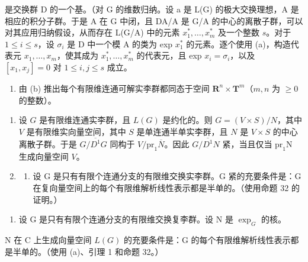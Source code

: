   是交换群 D 的一个基。（对 G 的维数归纳。设 a 是 L(G) 的极大交换理想，A 是相应的积分子群。于是 A 在 G 中闭，且 DA/A 是 G/A 的中心的离散子群，可以对其应用归纳假设，从而存在 L(G/A) 中的元素 \(x_1^*, \ldots, x_m^*\) 及一个整数 \(s\)。对于 \(1 \leqslant i \leqslant s\)，设 \(\sigma_i\) 是 D 中一个模 A 的类为 exp \(x_1^*\) 的元素。逐个使用 (a)，构造代表元 \(x_1, \ldots, x_m\)，使其成为 \(x_1^*, \ldots, x_m^*\) 的代表元，且 exp \(x_i = \sigma_i\)，以及 \([x_1, x_j] = 0\) 对 \(1 \leqslant i, j \leqslant s\) 成立。

\begin{enumerate}
\def\labelenumi{(\alph{enumi})}
\setcounter{enumi}{2}
\tightlist
\item
  由 (b) 推出每个有限维连通可解实李群都同态于空间 \(\mathbf{R}^n\times \mathbf{T}^m\)（\(m,n\) 为 \(\geqslant 0\) 的整数）。
\end{enumerate}

\begin{enumerate}
\def\labelenumi{\arabic{enumi}.}
\setcounter{enumi}{21}
\item
  设 \(G\) 是有限维连通实李群，且 \(L(G)\) 是约化的。则 \(G = (V \times S)/N\)，其中 \(V\) 是有限维实向量空间，其中 \(S\) 是单连通半单实李群，且 \(N\) 是 \(V \times S\) 的中心离散子群。于是 \(G/\overline{D^1}G\) 同构于 \(V/\mathrm{pr}_1\overline{N}\)。因此 \(G/\overline{D^1}N\) 紧，当且仅当 \(\mathrm{pr}_1\mathrm{N}\) 生成向量空间 \(V\)。
\item
  \begin{enumerate}
  \def\labelenumii{(\alph{enumii})}
  \tightlist
  \item
    设 G 是只有有限个连通分支的有限维交换实李群。G 紧的充要条件是：G 在复向量空间上的每个有限维解析线性表示都是半单的。（使用命题 32 的证明。）
  \end{enumerate}
\end{enumerate}

\begin{enumerate}
\def\labelenumi{(\alph{enumi})}
\setcounter{enumi}{1}
\tightlist
\item
  设 G 是只有有限个连通分支的有限维交换复李群。设 N 是 \(\exp_{G}\) 的核。
\end{enumerate}

N 在 C 上生成向量空间 \(L(G)\) 的充要条件是：G 的每个有限维解析线性表示都是半单的。（使用 (a)、引理 1 和命题 32。）

